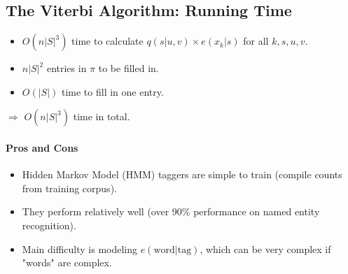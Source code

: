 \subsection{The Viterbi Algorithm: Running Time}
  \begin{itemize}
    \item $O(n|S|^3)$ time to calculate $q(s|u, v) \times e(x_k|s)$ for all $k, s, u, v$.
    \item $n|S|^2$ entries in $\pi$ to be filled in.
    \item $O(|S|)$ time to fill in one entry.
  \end{itemize}
  $\Rightarrow$ $O(n|S|^3)$ time in total.

\paragraph{Pros and Cons}
  \begin{itemize}
    \item Hidden Markov Model (HMM) taggers are simple to train (compile counts from training corpus).
    \item They perform relatively well (over 90\% performance on named entity recognition).
    \item Main difficulty is modeling $e(\text{word} | \text{tag})$, which can be very complex if "words" are complex.
  \end{itemize}
